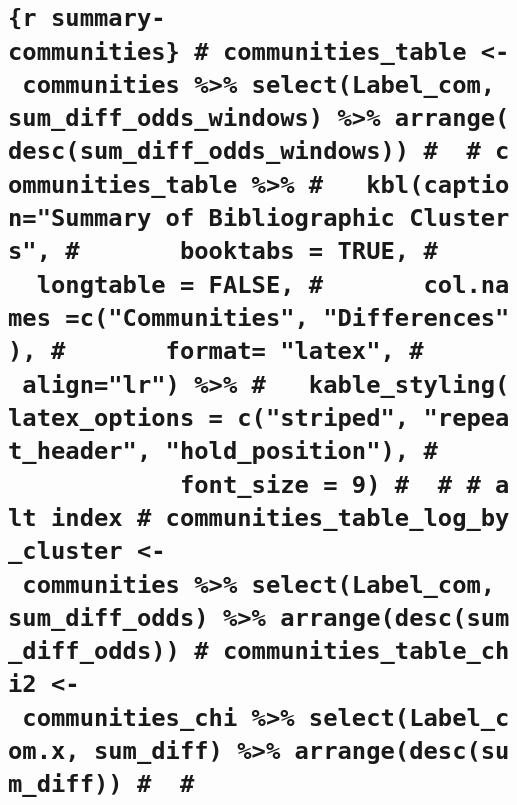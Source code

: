 \documentclass[
  12pt,
  onecolumn]{article}
\begin{document}
{\section{\texorpdfstring{\texttt{\{r\ summary-communities\}\ \#\ communities\_table\ \textless{}-\ communities\ \%\textgreater{}\%\ select(Label\_com,\ sum\_diff\_odds\_windows)\ \%\textgreater{}\%\ arrange(desc(sum\_diff\_odds\_windows))\ \#\ \ \#\ communities\_table\ \%\textgreater{}\%\ \#\ \ \ kbl(caption="Summary\ of\ Bibliographic\ Clusters",\ \#\ \ \ \ \ \ \ booktabs\ =\ TRUE,\ \#\ \ \ \ \ \ \ longtable\ =\ FALSE,\ \#\ \ \ \ \ \ \ col.names\ =c("Communities",\ "Differences"),\ \#\ \ \ \ \ \ \ format=\ "latex",\ \#\ \ \ \ \ \ \ align="lr")\ \%\textgreater{}\%\ \#\ \ \ kable\_styling(latex\_options\ =\ c("striped",\ "repeat\_header",\ "hold\_position"),\ \#\ \ \ \ \ \ \ \ \ \ \ \ \ \ \ \ \ font\_size\ =\ 9)\ \#\ \ \#\ \#\ alt\ index\ \#\ communities\_table\_log\_by\_cluster\ \textless{}-\ communities\ \%\textgreater{}\%\ select(Label\_com,\ sum\_diff\_odds)\ \%\textgreater{}\%\ arrange(desc(sum\_diff\_odds))\ \#\ communities\_table\_chi2\ \textless{}-\ communities\_chi\ \%\textgreater{}\%\ select(Label\_com.x,\ sum\_diff)\ \%\textgreater{}\%\ arrange(desc(sum\_diff))\ \#\ \ \#}}{\{r summary-communities\} \# communities\_table \textless- communities \%\textgreater\% select(Label\_com, sum\_diff\_odds\_windows) \%\textgreater\% arrange(desc(sum\_diff\_odds\_windows)) \#  \# communities\_table \%\textgreater\% \#   kbl(caption="Summary of Bibliographic Clusters", \#       booktabs = TRUE, \#       longtable = FALSE, \#       col.names =c("Communities", "Differences"), \#       format= "latex", \#       align="lr") \%\textgreater\% \#   kable\_styling(latex\_options = c("striped", "repeat\_header", "hold\_position"), \#                 font\_size = 9) \#  \# \# alt index \# communities\_table\_log\_by\_cluster \textless- communities \%\textgreater\% select(Label\_com, sum\_diff\_odds) \%\textgreater\% arrange(desc(sum\_diff\_odds)) \# communities\_table\_chi2 \textless- communities\_chi \%\textgreater\% select(Label\_com.x, sum\_diff) \%\textgreater\% arrange(desc(sum\_diff)) \#  \#}}\label{r-summary-communities-communities_table---communities-selectlabel_com-sum_diff_odds_windows-arrangedescsum_diff_odds_windows-communities_table-kblcaptionsummary-of-bibliographic-clusters-booktabs-true-longtable-false-col.names-ccommunities-differences-format-latex-alignlr-kable_stylinglatex_options-cstriped-repeat_header-hold_position-font_size-9-alt-index-communities_table_log_by_cluster---communities-selectlabel_com-sum_diff_odds-arrangedescsum_diff_odds-communities_table_chi2---communities_chi-selectlabel_com.x-sum_diff-arrangedescsum_diff}}
\end{document}
